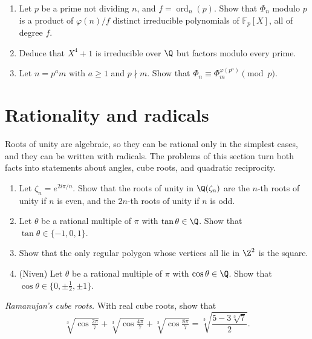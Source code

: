 \begin{exercise}[$\star\star$]\label{pb:phimodp}
\begin{enumerate}[label=(\alph*)]
\item Let $p$ be a prime not dividing $n$, and $f=\operatorname{ord}_n(p)$. Show that $\Phi_n$ modulo $p$ is a product of
$\varphi(n)/f$ distinct irreducible polynomials of $\mathbb F_p[X]$, all of degree $f$.
\item Deduce that $X^4+1$ is irreducible over $\Q$ but factors modulo every prime.
\item Let $n=p^am$ with $a\ge1$ and $p\nmid m$. Show that $\Phi_n\equiv\Phi_m^{\varphi(p^a)}\pmod p$.
\end{enumerate}
\end{exercise}

\section{Rationality and radicals}

Roots of unity are algebraic, so they can be rational only in the simplest cases, and they can be written with radicals.
The problems of this section turn both facts into statements about angles, cube roots, and quadratic reciprocity.

\begin{exercise}[$\star\star$]\label{pb:rattan}
\begin{enumerate}[label=(\alph*)]
\item Let $\zeta_n=e^{2i\pi/n}$. Show that the roots of unity in $\Q(\zeta_n)$ are the $n$-th roots of unity if $n$ is
even, and the $2n$-th roots of unity if $n$ is odd.
\item Let $\theta$ be a rational multiple of $\pi$ with $\tan\theta\in\Q$. Show that $\tan\theta\in\{-1,0,1\}$.
\item Show that the only regular polygon whose vertices all lie in $\Z^2$ is the square.
\item (Niven) Let $\theta$ be a rational multiple of $\pi$ with $\cos\theta\in\Q$. Show that
$\cos\theta\in\{0,\pm\frac12,\pm1\}$.
\end{enumerate}
\end{exercise}

\begin{exercise}[$\star\star\star$]\label{pb:ramacube}
\emph{Ramanujan's cube roots.} With real cube roots, show that
\[
\sqrt[3]{\cos\tfrac{2\pi}7}+\sqrt[3]{\cos\tfrac{4\pi}7}+\sqrt[3]{\cos\tfrac{8\pi}7}=\sqrt[3]{\frac{5-3\sqrt[3]7}2}.
\]
\end{exercise}

